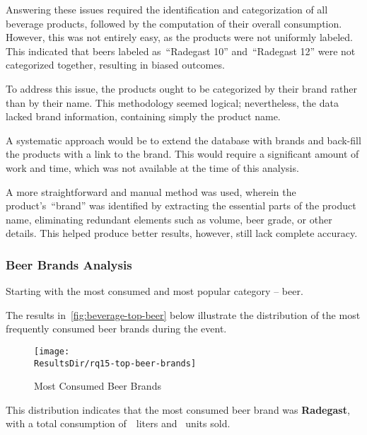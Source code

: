 Answering these issues required the identification and categorization of all beverage products, followed by the computation of their overall consumption.
However, this was not entirely easy, as the products were not uniformly labeled.
This indicated that beers labeled as~\enquote{Radegast 10} and~\enquote{Radegast 12} were not categorized together, resulting in biased outcomes.

To address this issue, the products ought to be categorized by their brand rather than by their name.
This methodology seemed logical; nevertheless, the data lacked brand information, containing simply the product name.

A systematic approach would be to extend the database with brands and back-fill the products with a link to the brand.
This would require a significant amount of work and time, which was not available at the time of this analysis.

A more straightforward and manual method was used, wherein the product's~\enquote{brand} was identified by extracting the essential parts of the product name, eliminating redundant elements such as volume, beer grade, or other details.
This helped produce better results, however, still lack complete accuracy.


\subsubsection{Beer Brands Analysis}
\label{subsubsec:analysis-beverage-popular-beer}
Starting with the most consumed and most popular category – beer.


The results in~\autoref{fig:beverage-top-beer} below illustrate the distribution of the most frequently consumed beer brands during the event.

\begin{figure}[H]
	\centering
	\texttt{[image: \\ResultsDir/rq15-top-beer-brands]}
	\caption{Most Consumed Beer Brands}
	\label{fig:beverage-top-beer}
	\source
\end{figure}

This distribution indicates that the most consumed beer brand was \textbf{Radegast}, with a total consumption of~~liters and~ units sold.

